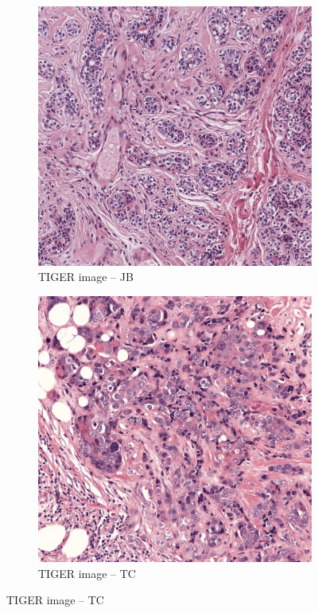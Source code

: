 \begin{figure}[H]
  \centering
  \begin{subfigure}[b]{0.32\textwidth}
    \centering
    \includegraphics[width=\linewidth]{assets/images/for_presentation/norm_100B_[10779, 11621, 12102, 12874].png}
    \caption{TIGER image – JB}
  \end{subfigure}\quad
  \begin{subfigure}[b]{0.32\textwidth}
    \centering
    \includegraphics[width=\linewidth]{assets/images/for_presentation/norm_TC_S01_P000003_C0001_B104_[50106, 52730, 51199, 53794].png}
    \caption{TIGER image – TC}
  \end{subfigure}


\end{figure}
